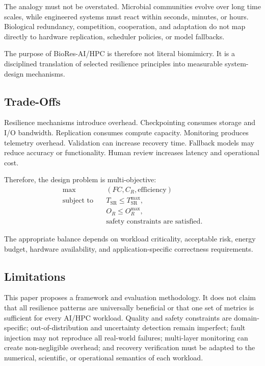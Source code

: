 \documentclass[conference]{IEEEtran}
\begin{document}
The analogy must not be overstated. Microbial communities evolve over long time scales, while engineered systems must react within seconds, minutes, or hours. Biological redundancy, competition, cooperation, and adaptation do not map directly to hardware replication, scheduler policies, or model fallbacks.

The purpose of BioRes-AI/HPC is therefore not literal biomimicry. It is a disciplined translation of selected resilience principles into measurable system-design mechanisms.

\subsection{Trade-Offs}

Resilience mechanisms introduce overhead. Checkpointing consumes storage and I/O bandwidth. Replication consumes compute capacity. Monitoring produces telemetry overhead. Validation can increase recovery time. Fallback models may reduce accuracy or functionality. Human review increases latency and operational cost.

Therefore, the design problem is multi-objective:
\begin{equation}
\begin{aligned}
\max \quad
& \left(FC, C_R, \text{efficiency}\right) \\
\text{subject to} \quad
& T_{\mathrm{SR}} \leq T_{\mathrm{SR}}^{\max}, \\
& O_R \leq O_R^{\max}, \\
& \text{safety constraints are satisfied}.
\end{aligned}
\label{eq:multi-objective-design}
\end{equation}

The appropriate balance depends on workload criticality, acceptable risk, energy budget, hardware availability, and application-specific correctness requirements.

\subsection{Limitations}

This paper proposes a framework and evaluation methodology. It does not claim that all resilience patterns are universally beneficial or that one set of metrics is sufficient for every AI/HPC workload. Quality and safety constraints are domain-specific; out-of-distribution and uncertainty detection remain imperfect; fault injection may not reproduce all real-world failures; multi-layer monitoring can create non-negligible overhead; and recovery verification must be adapted to the numerical, scientific, or operational semantics of each workload.
\end{document}
